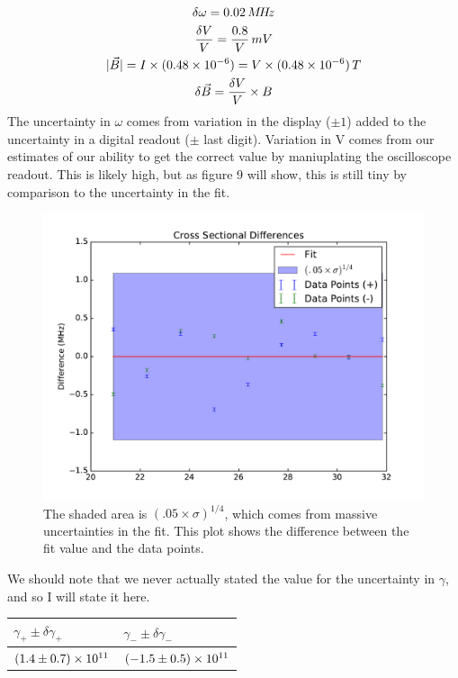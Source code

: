 \documentclass{article}
\DeclarePairedDelimiter\abs{\lvert}{\rvert}%
\DeclarePairedDelimiter{\parens}{\lparen}{\rparen}
\begin{document}
	\begin{gather*}
		\delta\omega = 0.02 \, M\!H\!z\\
		\frac{\delta V}{V} = \frac{0.8}{V} \, mV\\
		\abs{\vec{B}} = I\times\parens{0.48\times10^{-6}} = V\times\parens{0.48\times10^{-6}} \, T\\
		\delta \vec{B} = \frac{\delta V}{V} \times B
	\end{gather*}
	The uncertainty in $\omega$ comes from variation in the display ($\pm 1$) added to the uncertainty in a digital readout ($\pm$ last digit).  Variation in V comes from our estimates of our ability to get the correct value by maniuplating the oscilloscope readout.  This is likely high, but as figure 9 will show, this is still tiny by comparison to the uncertainty in the fit.

	\begin{figure}[!htb]
		\centering
		\includegraphics[scale=.5]{../plots/gamma_diff.pdf}
		\caption{The shaded area is $(.05 \times \sigma)^{1/4}$, which comes from massive uncertainties in the fit.  This plot shows the difference between the fit value and the data points.}
	\end{figure}

	We should note that we never actually stated the value for the uncertainty in $\gamma$, and so I will state it here.

	\begin{center}
	\begin{tabular}{|l|l|}
		\hline
		$\gamma_+ \pm \delta\gamma_+$ & $\gamma_- \pm \delta\gamma_-$ \\ 
		\hline
		$\parens*{1.4 \pm 0.7}\times 10^{11}$ & $\parens*{-1.5 \pm 0.5} \times 10^{11}$ \\ 
		\hline
	\end{tabular}
	\end{center}
\end{document}
